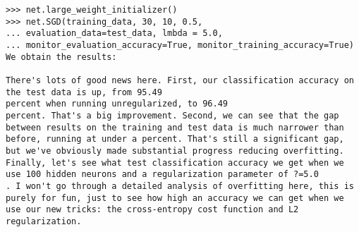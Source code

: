 \begin{lstlisting}
>>> net.large_weight_initializer()
>>> net.SGD(training_data, 30, 10, 0.5,
... evaluation_data=test_data, lmbda = 5.0,
... monitor_evaluation_accuracy=True, monitor_training_accuracy=True)
We obtain the results:

There's lots of good news here. First, our classification accuracy on the test data is up, from 95.49
percent when running unregularized, to 96.49
percent. That's a big improvement. Second, we can see that the gap between results on the training and test data is much narrower than before, running at under a percent. That's still a significant gap, but we've obviously made substantial progress reducing overfitting.
Finally, let's see what test classification accuracy we get when we use 100 hidden neurons and a regularization parameter of ?=5.0
. I won't go through a detailed analysis of overfitting here, this is purely for fun, just to see how high an accuracy we can get when we use our new tricks: the cross-entropy cost function and L2 regularization.
 

\end{lstlisting}
